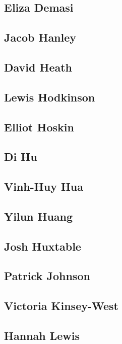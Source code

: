 \documentclass[twoside,14pt,a4paper,notitlepage]{memoir}
\begin{document}
\subsection*{Eliza Demasi}


\subsection*{Jacob Hanley}


\subsection*{David Heath}


\subsection*{Lewis Hodkinson}


\subsection*{Elliot Hoskin}


\subsection*{Di Hu}


\subsection*{Vinh-Huy Hua}


\subsection*{Yilun Huang}


\subsection*{Josh Huxtable}


\subsection*{Patrick Johnson}


\subsection*{Victoria Kinsey-West}


\subsection*{Hannah Lewis}
\end{document}
